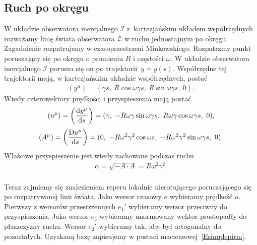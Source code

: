 \subsection{Ruch po okręgu}
W układzie obserwatora inercjalnego $\mathcal{I}$ z~kartezjańskim 
układem współrzędnych rozważamy linię świata 
obserwatora $\mathcal{Z}$ w ruchu jednostajnym po okręgu.
Zagadnienie rozpatrujemy w czasoprzestrzeni Minkowskiego.
Rozpatrzmy punkt poruszający się po okręgu o promieniu $R$ i 
częstości $\omega$. W układzie
obserwatora inercjalnego $\mathcal{I}$ porusza się on po 
trajektorii~$y=y(s)$. Współrzędne tej trajektorii mają, w kartezjańskim 
układzie współrzędnych, postać
\begin{align*}
(y^\mu) = (\gamma s,\ R\cos\omega\gamma s,\ R\sin\omega\gamma s,\ 0).
\end{align*}
Wtedy czterowektory prędkości i przyspieszenia mają postać
\begin{align*}
(u^\mu) = \left( \frac{\text{d} y^\mu}{\text{d} s} \right) 
= (\gamma,\ -R\omega\gamma\sin\omega\gamma s,
\ R\omega\gamma\cos\omega\gamma s,\ 0),
\end{align*}
\begin{align*}
(A^\mu) = \left( \frac{\text{D} u^\mu}{\text{d} s}\right) 
= (0,\ -R\omega^2\gamma^2\cos\omega s
,\ -R\omega^2\gamma^2\sin\omega\gamma s,\ 0).
\end{align*}
Właściwe przyspieszenie jest wtedy zachowane podczas ruchu
\begin{align*}
\alpha =\sqrt{ - A\cdot A} =  R\omega^2\gamma^2 .
\end{align*}
\\
%
Teraz zajmiemy się znalezieniem reperu lokalnie nierotującego
poruszającego się po rozpatrywanej linii świata.
Jako wersor czasowy $e$ wybieramy prędkość $u$. 
Pierwszy z wersorów przestrzennych $e_1'$ wybieramy 
wersor przeciwny do przyspieszenia.
Jako wersor $e_3$ wybieramy unormowany wektor 
prostopadły do płaszczyzny ruchu.
Wersor $e_2'$ wybieramy tak, aby był ortogonalny do pozostałych. 
Uzyskaną bazę zapisujemy w postaci macierzowej~\eqref{Esimplepirm}.

